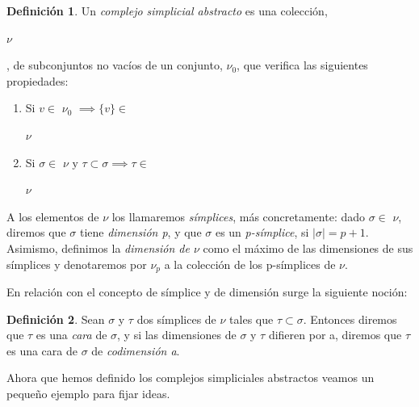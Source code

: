 \documentclass[12pt]{article}
\numberwithin{equation}{section}
\theoremstyle{definition}
\newtheorem{defi}{Definición}
\theoremstyle{remark}
\theoremstyle{plain}
\begin{document}
	\begin{defi}
	
	Un \textit{complejo simplicial abstracto} es una colección, 
	\begin{Large}$\nu$\end{Large}, de subconjuntos no vacíos de un 
	conjunto, {\Large $\nu$}$_{0}$, que verifica las siguientes 
	propiedades:
	
	\begin{enumerate}
		\item Si $v \in $ {\Large $ \nu$}$_{0}$ $ \implies \{v\} \in$
			\begin{Large}$ \nu$\end{Large}
		\item Si $\sigma \in $ {\Large $ \nu$}$ \text{ y } \tau \subset 
			\sigma \implies \tau \in $
			\begin{Large}$ \nu$\end{Large}
	\end{enumerate}
	
	A los elementos de {\Large $\nu$} los llamaremos \textit{símplices},
	más concretamente: dado $\sigma \in $ {\Large $\nu$}, diremos que 
	$\sigma$ tiene \textit{dimensión p}, y que $\sigma$ es un 
	\textit{p-símplice}, si $|\sigma|=p+1$. Asimismo, definimos la 
	\textit{dimensión de {\Large $\nu$}} como el máximo de las dimensiones 
	de sus símplices y denotaremos por {\Large $\nu$}$_{p}$ a la colección 
	de los p-símplices de {\Large $\nu$}.	
	
	\end{defi}
	
	En relación con el concepto de símplice y de dimensión surge la 
	siguiente noción: 

	\begin{defi}
		Sean $\sigma$ y $\tau$ dos símplices de {\Large $\nu$} tales 
		que $\tau \subset \sigma$. Entonces diremos que $\tau$ es una 
		\textit{cara} de $\sigma$, y si las dimensiones de $\sigma$ y 
		$\tau$ difieren por a, diremos que $\tau$ es una cara de 
		$\sigma$ de \textit{codimensión a}.
	\end{defi}

	Ahora que hemos definido los complejos simpliciales abstractos veamos 
	un pequeño ejemplo para fijar ideas.
\end{document}
